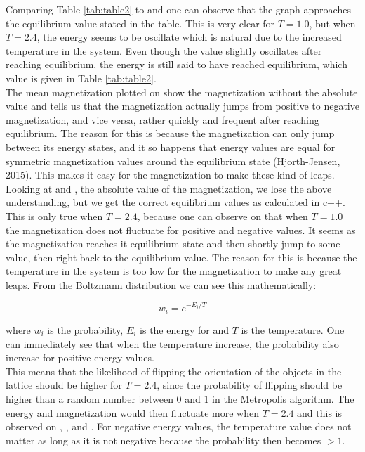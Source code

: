 \documentclass[10pt,a4paper]{article}
\begin{document}
\noindent Comparing Table \ref{tab:table2} to  and  one can observe that the graph approaches the equilibrium value stated in the table. This is very clear for $T = 1.0$, but when $T = 2.4$, the energy seems to be oscillate which is natural due to the increased temperature in the system. Even though the value slightly oscillates after reaching equilibrium, the energy is still said to have reached equilibrium, which value is given in Table \ref{tab:table2}.\\

\noindent The mean magnetization plotted on  show the magnetization without the absolute value and tells us that the magnetization actually jumps from positive to negative magnetization, and vice versa, rather quickly and frequent after reaching equilibrium. The reason for this is because the magnetization can only jump between its energy states, and it so happens that energy values are equal for symmetric magnetization values around the equilibrium state (Hjorth-Jensen, 2015). This makes it easy for the magnetization to make these kind of leaps. Looking at  and , the absolute value of the magnetization, we lose the above understanding, but we get the correct equilibrium values as calculated in c++.\\

\noindent This is only true when $T = 2.4$, because one can observe on  that when $T = 1.0$ the magnetization does not fluctuate for positive and negative values. It seems as the magnetization reaches it equilibrium state and then shortly jump to some value, then right back to the equilibrium value. The reason for this is because the temperature in the system is too low for the magnetization to make any great leaps. From the Boltzmann distribution we can see this mathematically:

$$
w_i = e^{-E_i/T}
$$

\noindent where $w_i$ is the probability, $E_i$ is the energy for and $T$ is the temperature. One can immediately see that when the temperature increase, the probability also increase for positive energy values.
\\
This means that the likelihood of flipping the orientation of the objects in the lattice should be higher for $T = 2.4$, since the probability of flipping should be higher than a random number between 0 and 1 in the Metropolis algorithm. The energy and magnetization would then fluctuate more when $T = 2.4$ and this is observed on , ,  and . For negative energy values, the temperature value does not matter as long as it is not negative because the probability then becomes $>1$.\\
\end{document}
